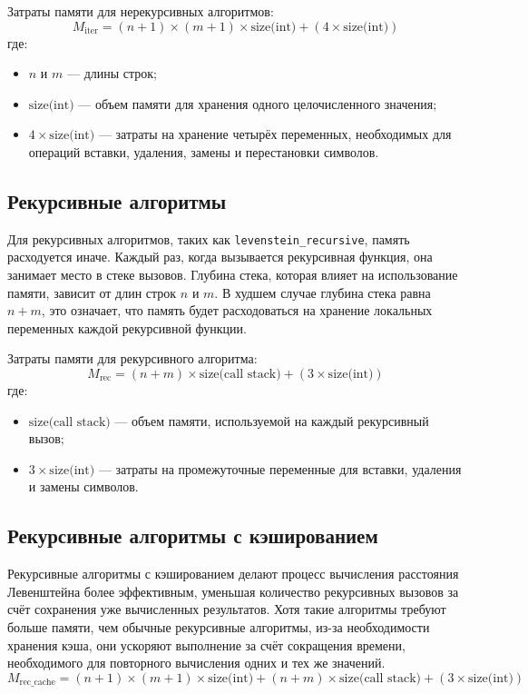 \documentclass[a4paper, 12pt]{extreport}
\begin{document}
Затраты памяти для нерекурсивных алгоритмов:
\[
M_{\text{iter}} = (n+1) \times (m+1) \times \text{size(int)} + (4 \times \text{size(int)})
\]
где:
\begin{itemize}
    \item[--] \(n\) и \(m\) — длины строк;
    \item[--] \(\text{size(int)}\) — объем памяти для хранения одного целочисленного значения;
    \item[--] \(4 \times \text{size(int)}\) — затраты на хранение четырёх переменных, необходимых для операций вставки, удаления, замены и перестановки символов.
\end{itemize}

\subsection{Рекурсивные алгоритмы}

Для рекурсивных алгоритмов, таких как \texttt{levenstein\_recursive}, память расходуется иначе. Каждый раз, когда вызывается рекурсивная функция, она занимает место в стеке вызовов. Глубина стека, которая влияет на использование памяти, зависит от длин строк \(n\) и \(m\). В худшем случае глубина стека равна \(n + m\), это означает, что память будет расходоваться на хранение локальных переменных каждой рекурсивной функции.

Затраты памяти для рекурсивного алгоритма:
\[
M_{\text{rec}} = (n + m) \times \text{size(call stack)} + (3 \times \text{size(int)})
\]
где:
\begin{itemize}
    \item[--] \(\text{size(call stack)}\) — объем памяти, используемой на каждый рекурсивный вызов;
    \item[--] \(3 \times \text{size(int)}\) — затраты на промежуточные переменные для вставки, удаления и замены символов.
\end{itemize}

\subsection{Рекурсивные алгоритмы с кэшированием}
Рекурсивные алгоритмы с кэшированием делают процесс вычисления расстояния Левенштейна более эффективным, уменьшая количество рекурсивных вызовов за счёт сохранения уже вычисленных результатов. Хотя такие алгоритмы требуют больше памяти, чем обычные рекурсивные алгоритмы, из-за необходимости хранения кэша, они ускоряют выполнение за счёт сокращения времени, необходимого для повторного вычисления одних и тех же значений.
\[
M_{\text{rec\_cache}} = (n+1) \times (m+1) \times \text{size(int)} + (n + m) \times \text{size(call stack)} + (3 \times \text{size(int)})
\]
\end{document}
